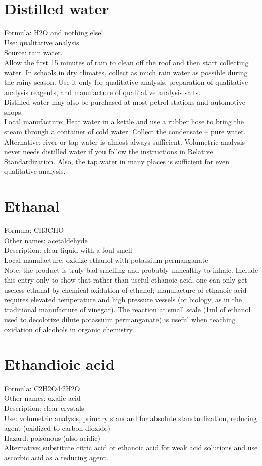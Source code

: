 \section{Distilled water}
Formula: H2O and nothing else!\\
Use: qualitative analysis\\
Source: rain water.\\
Allow the first 15 minutes of rain to clean off the roof 
and then start collecting water. 
In schools in dry climates, 
collect as much rain water as possible during the rainy season. 
Use it only for qualitative analysis, 
preparation of qualitative analysis reagents, 
and manufacture of qualitative analysis salts.\\ 
Distilled water may also be purchased at most petrol stations 
and automotive shops.\\
Local manufacture: Heat water in a kettle 
and use a rubber hose to bring the steam through a container of cold water. 
Collect the condensate – pure water.\\
Alternative: river or tap water is almost always sufficient. 
Volumetric analysis never needs distilled water 
if you follow the instructions in Relative Standardization. 
Also, 
the tap water in many places is sufficient for even qualitative analysis.

\section{Ethanal}
Formula: CH3CHO\\
Other names: acetaldehyde\\
Description: clear liquid with a foul smell\\
Local manufacture: oxidize ethanol with potassium permanganate\\
Note: the product is truly bad smelling and probably unhealthy to inhale. 
Include this entry only to show that rather than useful ethanoic acid, 
one can only get useless ethanal by chemical oxidation of ethanol; 
manufacture of ethanoic acid requires elevated temperature 
and high pressure vessels (or biology, 
as in the traditional manufacture of vinegar). 
The reaction at small scale 
(1ml of ethanol used to decolorize dilute potassium permanganate) 
is useful when teaching oxidation of alcohols in organic chemistry.

\section{Ethandioic acid}
Formula: C2H2O4∙2H2O\\
Other names: oxalic acid\\
Description: clear crystals\\
Use: volumetric analysis, 
primary standard for absolute standardization, 
reducing agent (oxidized to carbon dioxide)\\
Hazard: poisonous (also acidic)\\
Alternative: substitute citric acid or ethanoic acid 
for weak acid solutions and use ascorbic acid as a reducing agent.

